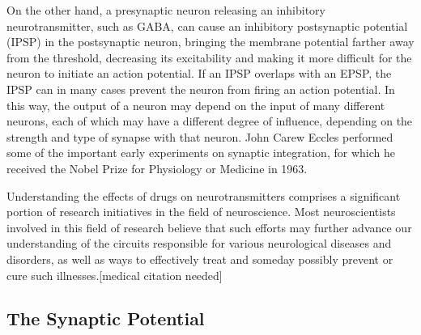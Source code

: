 On the other hand, a presynaptic neuron releasing an inhibitory neurotransmitter, such as GABA, can cause an inhibitory postsynaptic potential (IPSP) in the postsynaptic neuron, bringing the membrane potential farther away from the threshold, decreasing its excitability and making it more difficult for the neuron to initiate an action potential. If an IPSP overlaps with an EPSP, the IPSP can in many cases prevent the neuron from firing an action potential. In this way, the output of a neuron may depend on the input of many different neurons, each of which may have a different degree of influence, depending on the strength and type of synapse with that neuron. John Carew Eccles performed some of the important early experiments on synaptic integration, for which he received the Nobel Prize for Physiology or Medicine in 1963.

Understanding the effects of drugs on neurotransmitters comprises a significant portion of research initiatives in the field of neuroscience. Most neuroscientists involved in this field of research believe that such efforts may further advance our understanding of the circuits responsible for various neurological diseases and disorders, as well as ways to effectively treat and someday possibly prevent or cure such illnesses.{[}medical citation needed{]}

\hypertarget{the-synaptic-potential}{%
\subsection{The Synaptic Potential}\label{the-synaptic-potential}}

